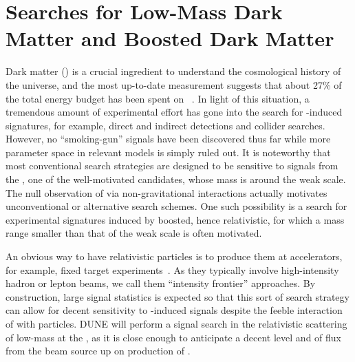 \section{Searches for Low-Mass  Dark Matter and Boosted Dark Matter}
Dark matter () is a crucial ingredient to understand the cosmological history of the universe, and the most up-to-date measurement suggests that about 27\% of the total energy budget has been spent on ~\cite{Aghanim:2018eyx}. 
In light of this situation, a tremendous amount of experimental effort has gone into %
the search for -induced signatures, for example,  direct and indirect detections and collider searches. However, no ``smoking-gun'' signals have been discovered thus far while more parameter space in relevant  models is simply ruled out. %
It is noteworthy that most conventional  search strategies are designed to be sensitive to signals from the , one of the well-motivated  candidates, whose mass is around 
 the weak scale. 
The null observation of  via non-gravitational interactions actually motivates unconventional or alternative  search schemes. 
One such possibility is %
a search for experimental signatures induced by boosted, hence relativistic,  for which %
a mass range smaller than that of the weak scale is often motivated. 

An obvious way to have relativistic  particles is to produce them at accelerators, 
for example, fixed target experiments~\cite{Alexander:2016aln, Battaglieri:2017aum, LoSecco:1980nf, Acciarri:2015uup}. 
As they typically involve high-intensity hadron or lepton beams, we %
call them ``intensity frontier'' approaches. 
By construction, large signal statistics is expected so that this sort of search strategy can allow for decent 
 sensitivity to -induced signals despite the feeble interaction of  with  particles. %
DUNE will perform a signal search in the relativistic scattering of low-mass  at the , as it is close enough to  anticipate a decent 
 level and of  flux from the beam source up on production of . 

